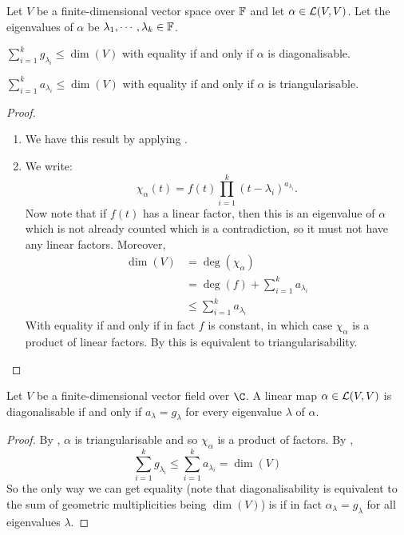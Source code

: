 \documentclass[../Main.tex]{subfiles}
\begin{document}
\begin{propositions}{
        Let $V$ be a finite-dimensional vector space over $\mathbb{F}$ and let $\alpha \in \mathcal{L}(V, V)$. Let the eigenvalues of $\alpha$ be $\lambda_1, \cdots, \lambda_k \in \mathbb{F}$.
        \label{propsAMGMIneqs}
    }
    \item $\sum_{i=1}^{k} g_{\lambda_i} \leq \dim(V)$ with equality if and only if $\alpha$ is diagonalisable. \label{propCompleteIffDiag}
    \item $\sum_{i = 1}^k a_{\lambda_i} \leq \dim(V)$ with equality if and only if $\alpha$ is triangularisable.
\end{propositions}
\begin{proof}
    \begin{enumerate}
        \item We have this result by applying .
        \item We write:
            \begin{equation*}
                \chi_\alpha(t) = f(t) \prod_{i=1}^{k}(t - \lambda_i)^{a_{\lambda_i}}.
            \end{equation*}
            Now note that if $f(t)$ has a linear factor, then this is an eigenvalue of $\alpha$ which is not already counted which is a contradiction, so it must not have any linear factors. Moreover,
            \begin{align*}
                \dim(V) &= \deg(\chi_\alpha) \\
                &= \deg(f) + \sum_{i=1}^{k} a_{\lambda_i} \\
                &\leq \sum_{i=1}^{k} a_{\lambda_i}
            \end{align*}
            With equality if and only if in fact $f$ is constant, in which case $\chi_\alpha$ is a product of linear factors. By  this is equivalent to triangularisability.
    \end{enumerate}
\end{proof}
\begin{proposition}
    Let $V$ be a finite-dimensional vector field over $\C$. A linear map $\alpha \in \mathcal{L}(V, V)$ is diagonalisable if and only if $a_\lambda = g_\lambda$ for every eigenvalue $\lambda$ of $\alpha$.
    \label{propDiagIfNotDegenerate}
\end{proposition}
\begin{proof}
    By 	, $\alpha$ is triangularisable and so $\chi_\alpha$ is a product of factors. By ,
    \begin{equation*}
        \sum_{i=1}^{k}g_{\lambda_i} \leq \sum_{i=1}^{k} a_{\lambda_i} = \dim(V)
    \end{equation*}
    So the only way we can get equality (note that diagonalisability is equivalent to the sum of geometric multiplicities being $\dim(V)$) is if in fact $\alpha_\lambda = g_\lambda$ for all eigenvalues $\lambda$.
\end{proof}
\end{document}
